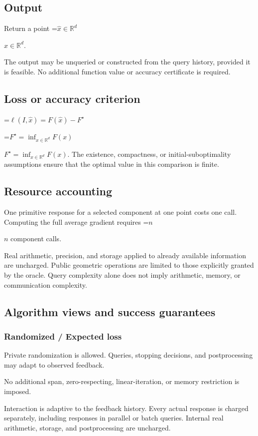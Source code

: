 \documentclass[10pt,a4paper]{article}
\newcommand{\AtlasMath}[1]{\par\begingroup\centering\setbox0=\hbox{$\displaystyle #1$}\ifdim\wd0>1.4\linewidth\typeout{ATLAS WIDE FORMULA: \the\wd0}\fi\ifdim\wd0>\linewidth\resizebox{\linewidth}{!}{\box0}\else\box0\fi\par\endgroup}
\newcommand{\AtlasInlineMath}[1]{\begingroup\setbox0=\hbox{$#1$}\ifdim\wd0>.4\linewidth\endgroup\AtlasMath{#1}\else\endgroup$#1$\fi}
\begin{document}
\subsection{Output}
Return a point \AtlasInlineMath{\widehat x\in\mathbb R^d}.

The output may be unqueried or constructed from the query history, provided it is feasible. No additional function value or accuracy certificate is required.

\subsection{Loss or accuracy criterion}

\AtlasMath{\ell(I,\widehat{x})=F(\widehat{x})-F^\star}


\AtlasInlineMath{F^\star=\inf_{x\in \mathbb{R}^d}F(x)}. The existence, compactness, or initial-suboptimality assumptions ensure that the optimal value in this comparison is finite.

\subsection{Resource accounting}
One primitive response for a selected component at one point costs one call. Computing the full average gradient requires \AtlasInlineMath{n} component calls.

Real arithmetic, precision, and storage applied to already available information are uncharged. Public geometric operations are limited to those explicitly granted by the oracle. Query complexity alone does not imply arithmetic, memory, or communication complexity.

\subsection{Algorithm views and success guarantees}
\subsubsection{Randomized / Expected loss}
Private randomization is allowed. Queries, stopping decisions, and postprocessing may adapt to observed feedback.

No additional span, zero-respecting, linear-iteration, or memory restriction is imposed.

Interaction is adaptive to the feedback history. Every actual response is charged separately, including responses in parallel or batch queries. Internal real arithmetic, storage, and postprocessing are uncharged.
\end{document}
